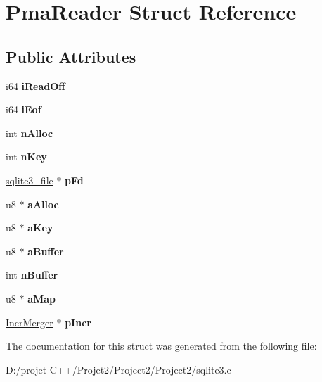 \hypertarget{struct_pma_reader}{}\section{Pma\+Reader Struct Reference}
\label{struct_pma_reader}
\subsection*{Public Attributes}
\begin{DoxyCompactItemize}
\item 
\mbox{\label{struct_pma_reader_a04a9b631060dcda1d94eb7b16ef8920e}} 
i64 {\bfseries i\+Read\+Off}
\item 
\mbox{\label{struct_pma_reader_a7a2e2745d054cd6d86e1ad57d641b657}} 
i64 {\bfseries i\+Eof}
\item 
\mbox{\label{struct_pma_reader_a82522a9128afb8bfb79b88a7c51726ef}} 
int {\bfseries n\+Alloc}
\item 
\mbox{\label{struct_pma_reader_a02c5dbf65efa252a84259b1ee2a7cd3c}} 
int {\bfseries n\+Key}
\item 
\mbox{\label{struct_pma_reader_a1ae1caa6e4b1900937135aeeaf1336cd}} 
\mbox{\hyperlink{structsqlite3__file}{sqlite3\+\_\+file}} $\ast$ {\bfseries p\+Fd}
\item 
\mbox{\label{struct_pma_reader_af8d5ac60d1ba7ff84e84d5eb6aba4447}} 
u8 $\ast$ {\bfseries a\+Alloc}
\item 
\mbox{\label{struct_pma_reader_af8f5dbc63cbbcbf9ee4c2c462ab1c6ff}} 
u8 $\ast$ {\bfseries a\+Key}
\item 
\mbox{\label{struct_pma_reader_acd2a7f3e0375a3f8dfa9e565d080e2c2}} 
u8 $\ast$ {\bfseries a\+Buffer}
\item 
\mbox{\label{struct_pma_reader_a422d021b0509c7e5eb2938bba36a5cdd}} 
int {\bfseries n\+Buffer}
\item 
\mbox{\label{struct_pma_reader_ad90dc0ec0c900dd21377c146ac73c73f}} 
u8 $\ast$ {\bfseries a\+Map}
\item 
\mbox{\label{struct_pma_reader_a34569bea49de8122239eb40eaae8b10f}} 
\mbox{\hyperlink{struct_incr_merger}{Incr\+Merger}} $\ast$ {\bfseries p\+Incr}
\end{DoxyCompactItemize}


The documentation for this struct was generated from the following file\+:\begin{DoxyCompactItemize}
\item 
D\+:/projet C++/\+Projet2/\+Project2/\+Project2/sqlite3.\+c\end{DoxyCompactItemize}
